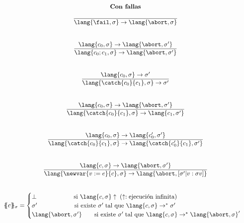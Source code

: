       \[\begin{array}{cll}
        \textbf{Con fallas} \\ \\
        \overline{\lang{\fail, \sigma} \rightarrow \lang{\abort, \sigma}} \\ \\ \\

        \lang{c_0, \sigma} \rightarrow \lang{\abort, \sigma'} \\
        \overline{\lang{c_0;c_1, \sigma} \rightarrow \lang{\abort, \sigma'}} \\ \\ \\

        \lang{c_0, \sigma} \rightarrow \sigma' \\
        \overline{\lang{\catch{c_0}{c_1}, \sigma} \rightarrow \sigma'} \\ \\ \\
        \lang{c_0, \sigma} \rightarrow \lang{\abort, \sigma'} \\
        \overline{\lang{\catch{c_0}{c_1}, \sigma} \rightarrow \lang{c_1, \sigma'}} \\ \\ \\
        \lang{c_0, \sigma} \rightarrow \lang{c'_0, \sigma'} \\
        \overline{\lang{\catch{c_0}{c_1}, \sigma} \rightarrow \lang{\catch{c'_0}{c_1}, \sigma'}} \\ \\ \\

        \lang{c, \sigma} \rightarrow \lang{\abort, \sigma'} \\
        \overline{\lang{\newvar{v := e}{c}, \sigma} \rightarrow \lang{\abort, [\sigma' | v : \sigma v]}} \\ \\ \\

        \{\!\!\{c\}\!\!\}_{\sigma} = \begin{cases}
                                      \bot \qquad\qquad\qquad  \text{si } \lang{c, \sigma} \uparrow \; (\uparrow: \text{ejecución infinita}) \\
                                      \sigma' \qquad\qquad\qquad \text{si existe } \sigma' \; \text{tal que } \lang{c, \sigma} \rightarrow^{\ast} \sigma' \\
                                      \lang{\abort, \sigma'} \qquad \text{si existe } \sigma' \; \text{tal que } \lang{c, \sigma} \rightarrow^{\ast} \lang{\abort, \sigma}'
                                     \end{cases}
      \end{array}\]
      
